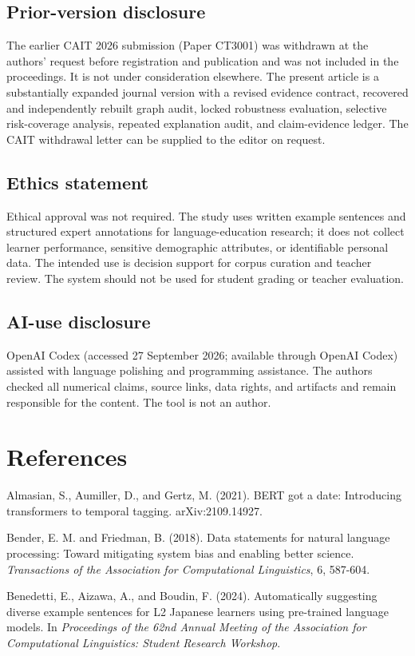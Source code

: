 \documentclass{CUP-JNL-NLP}
\begin{document}
\subsection{Prior-version disclosure}
The earlier CAIT 2026 submission (Paper CT3001) was withdrawn at the authors' request before registration and publication and was not included in the proceedings. It is not under consideration elsewhere. The present article is a substantially expanded journal version with a revised evidence contract, recovered and independently rebuilt graph audit, locked robustness evaluation, selective risk-coverage analysis, repeated explanation audit, and claim-evidence ledger. The CAIT withdrawal letter can be supplied to the editor on request.

\subsection{Ethics statement}
Ethical approval was not required. The study uses written example sentences and structured expert annotations for language-education research; it does not collect learner performance, sensitive demographic attributes, or identifiable personal data. The intended use is decision support for corpus curation and teacher review. The system should not be used for student grading or teacher evaluation.

\subsection{AI-use disclosure}
OpenAI Codex (accessed 27 September 2026; available through OpenAI Codex) assisted with language polishing and programming assistance. The authors checked all numerical claims, source links, data rights, and artifacts and remain responsible for the content. The tool is not an author.

\section{References}
Almasian, S., Aumiller, D., and Gertz, M. (2021). BERT got a date: Introducing transformers to temporal tagging. arXiv:2109.14927.

Bender, E. M. and Friedman, B. (2018). Data statements for natural language processing: Toward mitigating system bias and enabling better science. \emph{Transactions of the Association for Computational Linguistics}, 6, 587-604.

Benedetti, E., Aizawa, A., and Boudin, F. (2024). Automatically suggesting diverse example sentences for L2 Japanese learners using pre-trained language models. In \emph{Proceedings of the 62nd Annual Meeting of the Association for Computational Linguistics: Student Research Workshop}.
\end{document}

